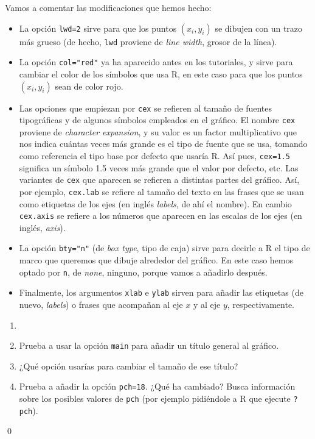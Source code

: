 \documentclass[10pt,a4paper]{article}\usepackage[]{graphicx}\usepackage[]{color}
\begin{document}
Vamos a comentar las modificaciones que hemos hecho:
\begin{itemize}
  \item La opción {\tt lwd=2} sirve para que los puntos $(x_i,y_i)$ se dibujen con un trazo más grueso (de hecho, {\tt lwd} proviene de {\em line width}, grosor de la línea).
  \item La opción {\verb#col="red"#} ya ha aparecido antes en los tutoriales, y sirve para cambiar el color de los símbolos que usa R, en este caso para que los puntos $(x_i,y_i)$ sean de color rojo.
  \item Las opciones que empiezan por {\tt cex} se refieren al tamaño de fuentes tipográficas y de algunos símbolos empleados en el gráfico. El nombre {\tt cex} proviene de {\em character expansion}, y su valor es un factor multiplicativo que nos indica cuántas veces más grande es el tipo de fuente que se usa, tomando como referencia el tipo base por defecto que usaría R. Así pues, {\tt cex=1.5} significa un símbolo 1.5 veces más grande que el valor por defecto, etc. Las variantes de {\tt cex} que aparecen se refieren a distintas partes del gráfico. Así, por ejemplo, {\tt cex.lab} se refiere al tamaño del texto en las frases que se usan como etiquetas de los ejes (en inglés {\em labels}, de ahí el nombre). En cambio {\tt cex.axis} se refiere a los números que aparecen en las escalas de los ejes (en inglés, {\em axis}).
  \item La opción \verb#bty="n"# (de {\em box type}, tipo de caja) sirve para decirle a R el tipo de marco que queremos que dibuje alrededor del gráfico. En este caso hemos optado por {\tt n}, de {\em none}, ninguno, porque vamos a añadirlo después.
  \item  Finalmente, los argumentos {\tt xlab} e {\tt ylab} sirven para añadir las etiquetas (de nuevo, {\em labels}) o frases que acompañan al eje $x$ y al eje $y$, respectivamente.
\end{itemize}

\begin{ejercicio}
\label{tut10:ejercicio04}
\begin{enumerate}
  \item[]
  \item Prueba a usar la opción {\tt main} para añadir un título general al gráfico.
  \item ¿Qué opción usarías para cambiar el tamaño de ese título?
  \item Prueba a añadir la opción {\tt pch=18}. ¿Qué ha cambiado? Busca información sobre los posibles valores de {\tt pch} (por ejemplo pidiéndole a R que ejecute {\tt ?pch}).
\end{enumerate}
\end{ejercicio}
\qed
\end{document}
